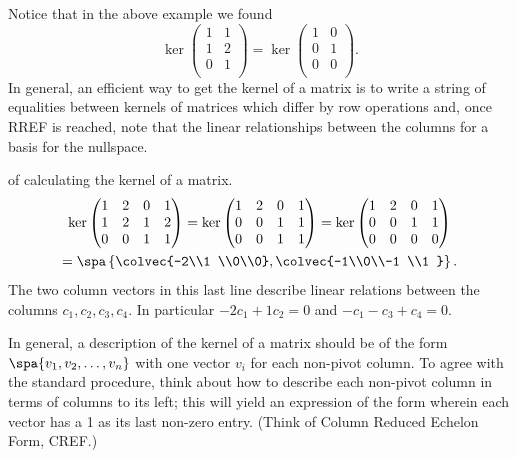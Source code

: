 
Notice that in the above example we found 
\[\ker 
\begin{pmatrix}
1 & 1  \\
1 & 2  \\
0 & 1 \\
\end{pmatrix} =
\ker
\begin{pmatrix}
1 & 0 \\
0 & 1  \\
0 & 0  \\
\end{pmatrix}.
\]
In general, an efficient way to get the  kernel of a matrix is to write a string of equalities between kernels of matrices which differ by row operations and, once RREF is reached, note that the linear relationships between the columns for a basis for the nullspace.

\begin{example} of calculating the kernel of a matrix.\\
\begin{gather*}
\ker 
\begin{pmatrix}
1&2&0&1 \\
1&2&1&2 \\
0&0&1&1
\end{pmatrix}
=
\ker 
\begin{pmatrix}
1&2&0&1 \\
0&0&1&1 \\
0&0&1&1
\end{pmatrix}
=
\ker 
\begin{pmatrix}
1&2&0&1 \\
0&0&1&1 \\
0&0&0&0
\end{pmatrix}
\\
=\spa \left\{ 
\colvec{-2\\1 \\0\\0}, \colvec{-1\\0\\-1 \\1 } 
 \right\} .
\end{gather*}
The two column vectors in this last line describe linear relations between the columns $c_1,c_2,c_3,c_4$. 
In particular $-2c_1+1c_2=0$ and $-c_1-c_3 +c_4=0$. 
\end{example}
In general, a description of the kernel of a matrix should be of the form 
$\spa \{ v_1,v_2,\dots,v_n\}$ with one vector $v_i$ for each non-pivot column. 
To agree with the standard procedure, think about how to describe each non-pivot column in terms of columns to its left; this will yield an expression of the form wherein each vector  has a 1 as its last non-zero entry. (Think of Column Reduced Echelon Form, CREF.) 

